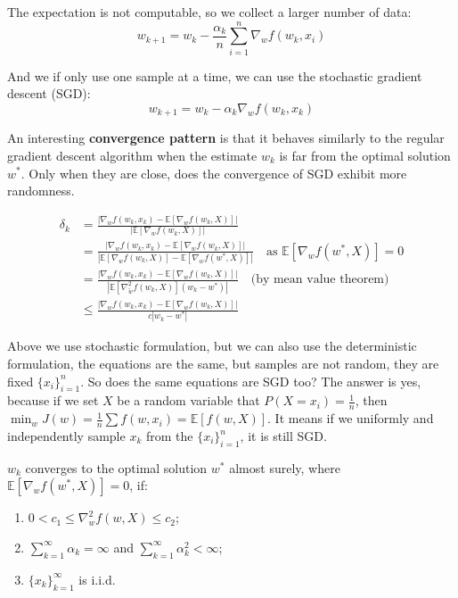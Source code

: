 \documentclass[10pt]{elegantbook}
\begin{document}
The expectation is not computable, so we collect a larger number of data:
\[ w_{k+1} = w_k - \frac{\alpha_k}{n} \sum_{i=1}^{n} \nabla_{w} f(w_k, x_i) \]

And we if only use one sample at a time, we can use the stochastic gradient descent (SGD):
\begin{equation}
    w_{k+1} = w_k - \alpha_k \nabla_{w} f(w_k, x_k)
\end{equation}

An interesting \textbf{convergence pattern} is that it behaves similarly to the regular gradient
descent algorithm when the estimate $w_k$ is far from the optimal solution $w^*$. Only when
they are close, does the convergence of SGD exhibit more randomness.

\begin{align*}
\delta_k &= \frac{\left| \nabla_{w} f(w_k, x_k) - \mathbb{E}\left[\nabla_{w} f(w_k, X)\right] \right|}
                {\left| \mathbb{E}\left[\nabla_{w} f(w_k, X)\right] \right|} \\
&= \frac{\left| \nabla_{w} f(w_k, x_k) - \mathbb{E}\left[\nabla_{w} f(w_k, X)\right] \right|}
         {\left| \mathbb{E}\left[\nabla_{w} f(w_k, X)\right] - \mathbb{E}\left[\nabla_{w} f(w^*, X)\right] \right|} 
         \quad \text{as } \mathbb{E}\left[\nabla_{w} f(w^*, X)\right] = 0 \\
&= \frac{\left| \nabla_{w} f(w_k, x_k) - \mathbb{E}\left[\nabla_{w} f(w_k, X)\right] \right|}
         {\left| \mathbb{E}\left[\nabla^2_{\tilde w} f(w_k, X)\right](w_k - w^*) \right|}
         \quad \text{(by mean value theorem)} \\
&\leq \frac{\left| \nabla_{w} f(w_k, x_k) - \mathbb{E}\left[\nabla_{w} f(w_k, X)\right] \right|}
          {c \left| w_k - w^* \right|}
\end{align*}

Above we use stochastic formulation, but we can also use the deterministic formulation, the equations are the same, but samples are not 
random, they are fixed $\{ x_i \}_{i=1}^n$. So does the same equations are SGD too? The answer is yes, because if we set $X$ be a random variable that
$P(X = x_i) = \frac{1}{n}$, then $\min_w J(w) = \frac{1}{n} \sum f(w, x_i) = \mathbb E[f(w, X)]$.
It means if we uniformly and independently sample $x_k$ from the $\{ x_i \}_{i=1}^n$, it is still SGD.

\begin{theorem}
    $w_k$ converges to the optimal solution $w^*$ almost surely, where $\mathbb{E}\left[\nabla_{w} f(w^*, X)\right] = 0$, if:
    \begin{enumerate}
        \item $0 < c_1 \leq \nabla_w^2 f(w, X) \leq c_2$;
        \item $\sum_{k=1}^{\infty} \alpha_k = \infty$ and $\sum_{k=1}^{\infty} \alpha_k^2 < \infty$;
        \item $\{ x_k \}_{k=1}^{\infty}$ is i.i.d.
    \end{enumerate}
\end{theorem}
\end{document}
